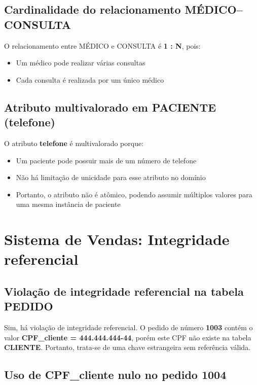 \documentclass[12pt,a4paper]{article}
\begin{document}
\subsection{Cardinalidade do relacionamento MÉDICO--CONSULTA}

O relacionamento entre MÉDICO e CONSULTA é \textbf{1 : N}, pois:

\begin{itemize}
\item Um médico pode realizar várias consultas
\item Cada consulta é realizada por um único médico
\end{itemize}

\subsection{Atributo multivalorado em PACIENTE (telefone)}

O atributo \textbf{telefone} é multivalorado porque:

\begin{itemize}
\item Um paciente pode possuir mais de um número de telefone
\item Não há limitação de unicidade para esse atributo no domínio
\item Portanto, o atributo não é atômico, podendo assumir múltiplos valores para uma mesma instância de paciente
\end{itemize}

\section{Sistema de Vendas: Integridade referencial}

\subsection{Violação de integridade referencial na tabela PEDIDO}

Sim, há violação de integridade referencial. O pedido de número \textbf{1003} contém o valor \textbf{CPF\_cliente = 444.444.444-44}, porém este CPF não existe na tabela \textbf{CLIENTE}. Portanto, trata-se de uma chave estrangeira sem referência válida.

\subsection{Uso de CPF\_cliente nulo no pedido 1004}
\end{document}
